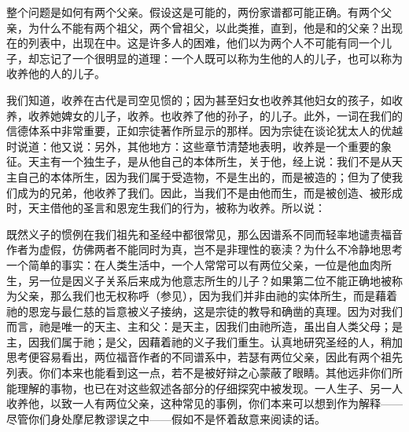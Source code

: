 整个问题是如何有两个父亲。假设这是可能的，两份家谱都可能正确。有两个父亲，为什么不能有两个祖父，两个曾祖父，以此类推，直到，他是和的父亲？出现在的列表中，出现在中。这是许多人的困难，他们以为两个人不可能有同一个儿子，却忘记了一个很明显的道理：一个人既可以称为生他的人的儿子，也可以称为收养他的人的儿子。\par

我们知道，收养在古代是司空见惯的；因为甚至妇女也收养其他妇女的孩子，如收养，收养她婢女的儿子，收养。也收养了他的孙子，的儿子。此外，一词在我们的信德体系中非常重要，正如宗徒著作所显示的那样。因为宗徒在谈论犹太人的优越时说道：他又说：另外，其他地方：这些章节清楚地表明，收养是一个重要的象征。天主有一个独生子，是从他自己的本体所生，关于他，经上说：我们不是从天主自己的本体所生，因为我们属于受造物，不是生出的，而是被造的；但为了使我们成为的兄弟，他收养了我们。因此，当我们不是由他而生，而是被创造、被形成时，天主借他的圣言和恩宠生我们的行为，被称为收养。所以说：\par

既然义子的惯例在我们祖先和圣经中都很常见，那么因谱系不同而轻率地谴责福音作者为虚假，仿佛两者不能同时为真，岂不是非理性的亵渎？为什么不冷静地思考一个简单的事实：在人类生活中，一个人常常可以有两位父亲，一位是他血肉所生，另一位是因义子关系后来成为他意志所生的儿子？如果第二位不能正确地被称为父亲，那么我们也无权称呼（参见），因为我们并非由祂的实体所生，而是藉着祂的恩宠与最仁慈的旨意被义子接纳，这是宗徒的教导和确凿的真理。因为对我们而言，祂是唯一的天主、主和父：是天主，因我们由祂所造，虽出自人类父母；是主，因我们属于祂；是父，因藉着祂的义子我们重生。认真地研究圣经的人，稍加思考便容易看出，两位福音作者的不同谱系中，若瑟有两位父亲，因此有两个祖先列表。你们本来也能看到这一点，若不是被好辩之心蒙蔽了眼睛。其他远非你们所能理解的事物，也已在对这些叙述各部分的仔细探究中被发现。一人生子、另一人收养他，以致一人有两位父亲，这种常见的事例，你们本来可以想到作为解释——尽管你们身处摩尼教谬误之中——假如不是怀着敌意来阅读的话。\par

